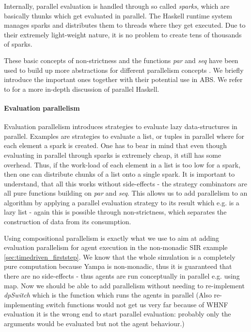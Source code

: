 Internally, parallel evaluation is handled through so called \textit{sparks}, which are basically thunks which get evaluated in parallel. The Haskell runtime system manages sparks and distributes them to threads where they get executed. Due to their extremely light-weight nature, it is no problem to create tens of thousands of sparks.

These basic concepts of non-strictness and the functions \textit{par} and \textit{seq} have been used to build up more abstractions for different parallelism concepts \cite{marlow_parallel_2013}. We briefly introduce the important ones together with their potential use in ABS. We refer to \cite{marlow_parallel_2013} for a more in-depth discussion of parallel Haskell.

\paragraph{Evaluation parallelism}
Evaluation parallelism introduces strategies to evaluate lazy data-structures in parallel. Examples are strategies to evaluate a list, or tuples in parallel where for each element a spark is created. One has to bear in mind that even though evaluating in parallel through sparks is extremely cheap, it still has some overhead. Thus, if the work-load of each element in a list is too low for a spark, then one can distribute chunks of a list onto a single spark.
It is important to understand, that all this works without side-effects - the strategy combinators are all pure functions building on \textit{par} and \textit{seq}. This allows us to add parallelism to an algorithm by applying a parallel evaluation strategy to its result which e.g. is a lazy list - again this is possible through non-strictness, which separates the construction of data from its consumption.

Using compositional parallelism is exactly what we use to aim at adding evaluation parallelism for agent execution in the non-monadic SIR example \ref{sec:timedriven_firststep}. We know that the whole simulation is a completely pure computation because Yampa is non-monadic, thus it is guaranteed that there are no side-effects - thus agents are run conceptually in parallel e.g. using map. Now we should be able to add parallelism without needing to re-implement \textit{dpSwitch} which is the function which runs the agents in parallel (Also re-implementing switch functions would not get us very far because of WHNF evaluation it is the wrong end to start parallel evaluation: probably only the arguments would be evaluated but not the agent behaviour.)

